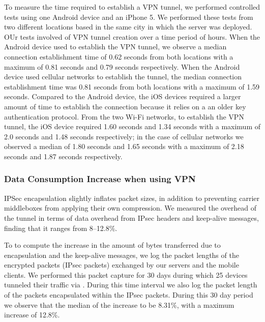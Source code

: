 To measure the time required to establish a VPN tunnel, we performed controlled tests using one Android device and an iPhone 5. 
We performed these tests from two different locations based in the same city in which the server was deployed.
OUr tests involved  of VPN tunnel creation over a time period of \tbdv{} hours. 
When the Android device used \wifi to establish the VPN tunnel, we observe a median connection establishment time of 0.62 seconds from both locations with a maximum of 0.81 seconds and 0.79 seconds respectively. 
When the Android device used cellular networks to establish the tunnel, the median connection establishment time was 0.81 seconds from both locations with a maximum of 1.59 seconds.
Compared to the Android device, the iOS devices required a larger amount of time to establish the connection because it relies on a an older key authentication protocol. 
From the two Wi-Fi networks, to establish the VPN tunnel, the iOS device required 1.60 seconds and 1.34 seconds with a maximum of 2.0 seconds and 1.48 seconds respectively; in the case of cellular networks  we observed a median of 1.80 seconds and 1.65 seconds with a maximum of 2.18 seconds and 1.87 seconds respectively. 


\subsubsection{Data Consumption Increase when using VPN}
IPSec encapsulation slightly inflates packet sizes, in addition to preventing carrier middleboxes from applying their own compression.
We measured the overhead of the tunnel in terms of data overhead from IPsec headers and keep-alive messages, finding that it
ranges from 8--12.8\%.

To to compute the increase in the amount of bytes transferred due to encapsulation and the keep-alive
messages, we log the packet lengths of the encrypted packets (IPsec packets) exchanged by our \platname servers and the mobile clients. 
We performed this packet capture for 30 days during which 25 devices tunneled their traffic via \platname. 
During this time interval we also log the packet length of the packets encapsulated within the IPsec packets. 
During this 30 day period we observe that the median of the increase to be 8.31\%, with a maximum increase of 12.8\%.


